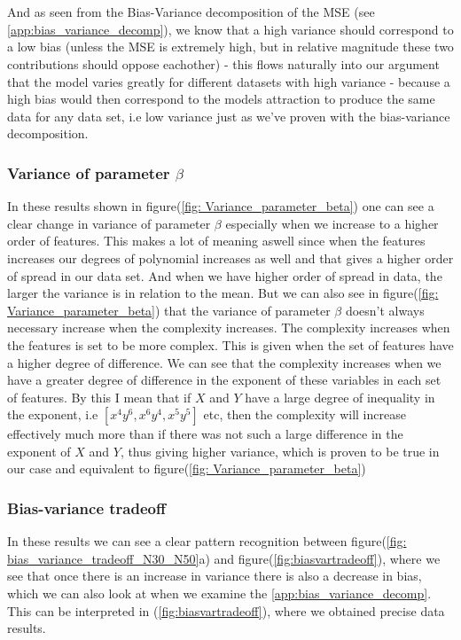 \documentclass[../main.tex]{subfiles}
\begin{document}
\\\\\indent And as seen from the Bias-Variance decomposition of the MSE (see \eqref{app:bias_variance_decomp}), we know that a high variance should correspond to a low bias (unless the MSE is extremely high, but in relative magnitude these two contributions should oppose eachother) - this flows naturally into our argument that the model varies greatly for different datasets with high variance - because a high bias would then correspond to the models attraction to produce the same data for any data set, i.e low variance just as we've proven with the bias-variance decomposition.

\subsubsection{Variance of parameter $\beta$}\label{Discussion:Variance_of_beta}
In these results shown in figure(\ref{fig: Variance_parameter_beta}) one can see a clear change in variance of parameter $\beta$ especially when we increase to a higher order of features. This makes a lot of meaning aswell since when the features increases our degrees of polynomial increases as well and that gives a higher order of spread in our data set. And when we have higher order of spread in data, the larger the variance is in relation to the mean.
\vskip0.1in
But we can also see in figure(\ref{fig: Variance_parameter_beta}) that the variance of parameter $\beta$ doesn't always necessary increase when the complexity increases. The complexity increases when the features is set to be more complex. This is given when the set of features have a higher degree of difference. We can see that the complexity increases when we have a greater degree of difference in the exponent of these variables in each set of features. By this I mean that if $X$ and $Y$ have a large degree of inequality in the exponent, i.e $[x^4y^6,x^6y^4,x^5y^5]$ etc, then the complexity will increase effectively much more than if there was not such a large difference in the exponent of $X$ and $Y$, thus giving higher variance, which is proven to  be true in our case and equivalent to figure(\ref{fig: Variance_parameter_beta})

\subsubsection{Bias-variance tradeoff}
In these results we can see a clear pattern recognition between figure(\ref{fig: bias_variance_tradeoff_N30_N50}a) and figure(\ref{fig:biasvartradeoff}), where we see that once there is an increase in variance there is also a decrease in bias, which we can also look at when we examine the \eqref{app:bias_variance_decomp}. This can be interpreted in (\ref{fig:biasvartradeoff}), where we obtained precise data results.
\vskip0.1in 
\end{document}

